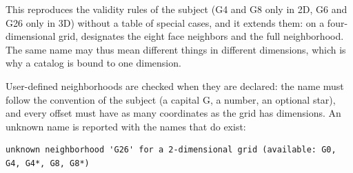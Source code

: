 This reproduces the validity rules of the subject (G4 and G8 only in 2D, G6 and G26 only in 3D)
without a table of special cases, and it extends them: on a four-dimensional grid, 
designates the eight face neighbors and  the full neighborhood. The same name may thus
mean different things in different dimensions, which is why a catalog is bound to one dimension.

User-defined neighborhoods are checked when they are declared: the name must follow the
convention of the subject (a capital G, a number, an optional star), and every offset must have
as many coordinates as the grid has dimensions. An unknown name is reported with the names that
do exist:

\begin{lstlisting}[style=text]
unknown neighborhood 'G26' for a 2-dimensional grid (available: G0, G4, G4*, G8, G8*)
\end{lstlisting}

